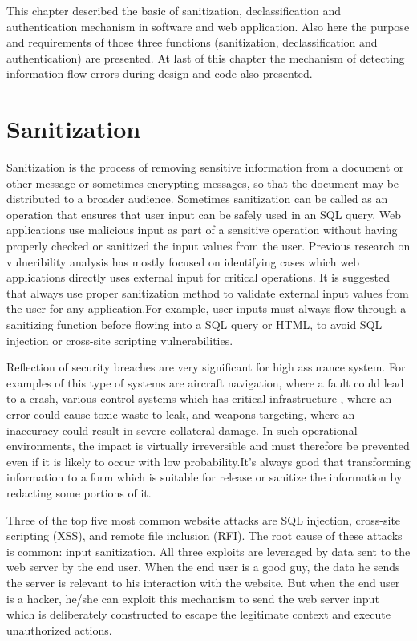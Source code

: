 This chapter described the basic of sanitization, declassification and authentication mechanism in software and web application. Also here the purpose and requirements of those three functions (sanitization, declassification and authentication) are presented. At last of this chapter the mechanism of detecting information flow errors during design and code also presented.

\section{Sanitization}
Sanitization is the process of removing sensitive information from a document or other message or sometimes encrypting messages, so that the document may be distributed to a broader audience. Sometimes sanitization can be called as an operation that ensures that user input can be safely used in an SQL query. Web applications use malicious input as part of a sensitive operation without having properly checked or sanitized the input values from the user. Previous research on vulneribility analysis has mostly focused on identifying cases which web applications directly uses external input for critical operations. It is suggested that always use proper sanitization method to validate external input values from the user for any application.For example, user inputs must always flow through a sanitizing function before flowing into a SQL query or HTML, to avoid SQL injection or cross-site scripting vulnerabilities.

Reflection of security breaches are very significant for high assurance system. For examples of this type of systems are aircraft navigation, where a fault could lead to a crash, various control systems which has critical infrastructure , where an error 
could cause toxic waste to leak, and weapons targeting, where an inaccuracy could result in severe collateral damage. In such
operational environments, the impact is virtually irreversible and must therefore be prevented even if it is likely to occur
with low probability.It's always good that transforming information to a form which is suitable for release or sanitize the information by redacting some portions of it.

Three of the top five most common website attacks are SQL injection, cross-site scripting (XSS), and remote file inclusion (RFI). The root cause of these attacks is common: input sanitization. All three exploits are leveraged by data sent to the web server by the end user. When the end user is a good guy, the data he sends the server is relevant to his interaction with the website. But when the end user is a hacker, he/she can exploit this mechanism to send the web server input which is deliberately constructed to escape the legitimate context and execute unauthorized actions.

